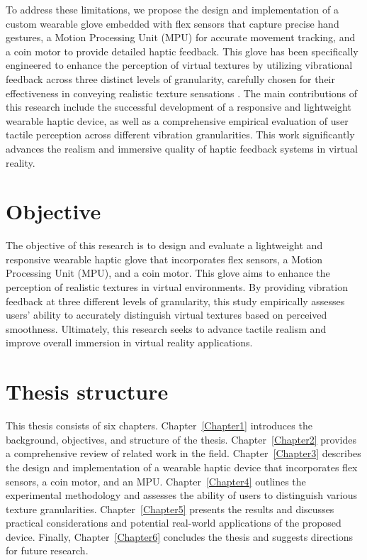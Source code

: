 To address these limitations, we propose the design and implementation of a custom wearable glove embedded with flex sensors that capture precise hand gestures, a Motion Processing Unit (MPU) for accurate movement tracking, and a coin motor to provide detailed haptic feedback. This glove has been specifically engineered to enhance the perception of virtual textures by utilizing vibrational feedback across three distinct levels of granularity, carefully chosen for their effectiveness in conveying realistic texture sensations \cite{10.1145/3025453.3025812}. The main contributions of this research include the successful development of a responsive and lightweight wearable haptic device, as well as a comprehensive empirical evaluation of user tactile perception across different vibration granularities. This work significantly advances the realism and immersive quality of haptic feedback systems in virtual reality.


\section{Objective}

The objective of this research is to design and evaluate a lightweight and responsive wearable haptic glove that incorporates flex sensors, a Motion Processing Unit (MPU), and a coin motor. This glove aims to enhance the perception of realistic textures in virtual environments. By providing vibration feedback at three different levels of granularity, this study empirically assesses users' ability to accurately distinguish virtual textures based on perceived smoothness. Ultimately, this research seeks to advance tactile realism and improve overall immersion in virtual reality applications.

\section{Thesis structure}

This thesis consists of six chapters. Chapter~\ref{Chapter1}  introduces the background, objectives, and structure of the thesis. Chapter~\ref{Chapter2} provides a comprehensive review of related work in the field. Chapter~\ref{Chapter3} describes the design and implementation of a wearable haptic device that incorporates flex sensors, a coin motor, and an MPU. Chapter~\ref{Chapter4} outlines the experimental methodology and assesses the ability of users to distinguish various texture granularities. Chapter~\ref{Chapter5} presents the results and discusses practical considerations and potential real-world applications of the proposed device. Finally, Chapter~\ref{Chapter6} concludes the thesis and suggests directions for future research.



